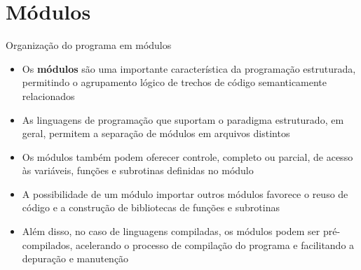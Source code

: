 \section{Módulos}

\begin{frame}[fragile]{Organização do programa em módulos}

    \begin{itemize}
        \item Os \textbf{módulos} são uma importante característica da programação estruturada,
            permitindo o agrupamento lógico de trechos de código semanticamente relacionados

        \item As linguagens de programação que suportam o paradigma estruturado, em geral, permitem
            a separação de módulos em arquivos distintos

        \item Os módulos também podem oferecer controle, completo ou parcial, de acesso às 
            variáveis, funções e subrotinas definidas no módulo

        \item A possibilidade de um módulo importar outros módulos favorece o reuso de código e 
            a construção de bibliotecas de funções e subrotinas

        \item Além disso, no caso de linguagens compiladas, os módulos podem ser pré-compilados,
            acelerando o processo de compilação do programa e facilitando a depuração e manutenção
    \end{itemize}

\end{frame}

